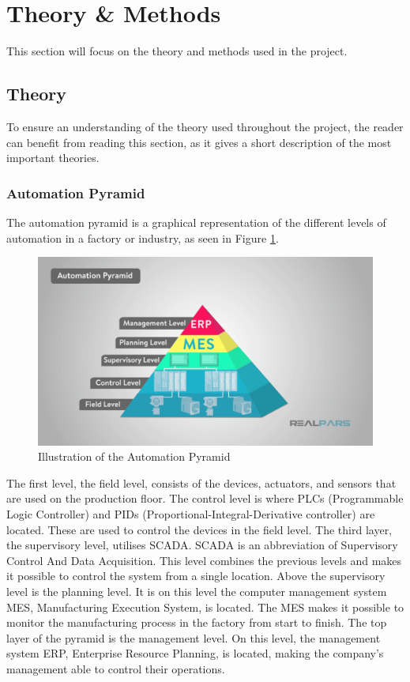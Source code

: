 \section{Theory \& Methods}
This section will focus on the theory and methods used in the project.

\subsection{Theory}
To ensure an understanding of the theory used throughout the project, the reader
can benefit from reading this section, as it gives a short description of the
most important theories.

\subsubsection{Automation Pyramid}
The automation pyramid is a graphical representation of the different levels of
automation in a factory or industry, as seen in Figure \ref{figure:ap}.

\begin{figure}[ht]
	\centering 
	\includegraphics[width=1\linewidth]{images/automation_pyramid}
	\caption{Illustration of the Automation Pyramid}
	\label{figure:ap}
\end{figure}


The first level, the field level, consists of the devices, actuators, and
sensors that are used on the production floor. The control level is where PLCs
(Programmable Logic Controller) and PIDs (Proportional-Integral-Derivative
controller) are located. These are used to control the devices in the field
level. The third layer, the supervisory level, utilises SCADA. SCADA
is an abbreviation of Supervisory Control And Data Acquisition. This level
combines the previous levels and makes it possible to control the system from
a single location. Above the supervisory level is the planning level. It is on
this level the computer management system MES, Manufacturing Execution System,
is located. The MES makes it possible to monitor the manufacturing process in
the factory from start to finish. The top layer of the pyramid is the management
level. On this level, the management system ERP, Enterprise Resource Planning, 
is located, making the company's management able to control their operations.
\cite{ap}\\

